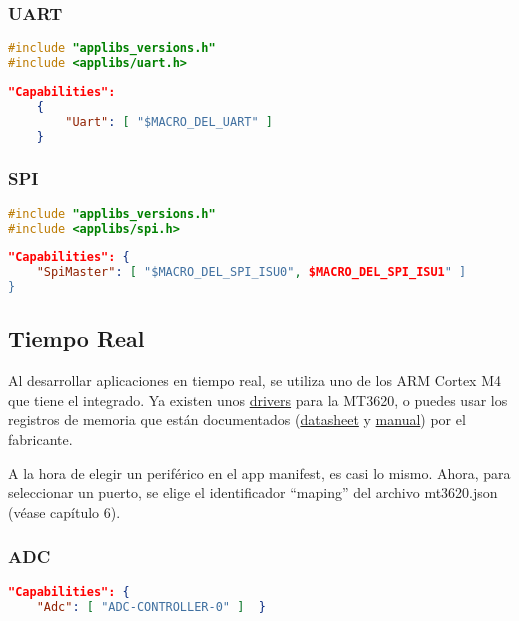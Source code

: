 \subsubsection{UART}
\begin{lstlisting}[language = C, firstnumber=0]
#include "applibs_versions.h"
#include <applibs/uart.h>
\end{lstlisting}
\begin{lstlisting}[language = json, firstnumber=0]	
	"Capabilities": 
	{  
		"Uart": [ "$MACRO_DEL_UART" ] 
	}
\end{lstlisting}

\subsubsection{SPI}
\begin{lstlisting}[language = C, firstnumber=0]
#include "applibs_versions.h"
#include <applibs/spi.h>
\end{lstlisting}
\begin{lstlisting}[language = json, firstnumber=0]	
"Capabilities": {  
	"SpiMaster": [ "$MACRO_DEL_SPI_ISU0", $MACRO_DEL_SPI_ISU1" ]
}
\end{lstlisting}

\subsection{Tiempo Real}
Al desarrollar aplicaciones en tiempo real, se utiliza uno de los ARM Cortex M4 que tiene el integrado. Ya existen unos \href{https://github.com/CodethinkLabs/mt3620-m4-drivers/tree/master}{drivers} para la MT3620, o puedes usar los registros de memoria que están documentados (\href{https://d86o2zu8ugzlg.cloudfront.net/mediatek-craft/documents/mt3620/MT3620-Datasheet-v1.7.pdf}{datasheet} y
\href{https://d86o2zu8ugzlg.cloudfront.net/mediatek-craft/documents/MT3620-M4-User-Manual.pdf}{manual}) por el fabricante.

A la hora de elegir un periférico en el app manifest, es casi lo mismo. Ahora, para seleccionar un puerto, se elige el identificador ``maping'' del archivo mt3620.json (véase capítulo 6).

\subsubsection{ADC}
\begin{lstlisting}[language = json, firstnumber=0]	
"Capabilities": {
	"Adc": [ "ADC-CONTROLLER-0" ]  }
\end{lstlisting}

